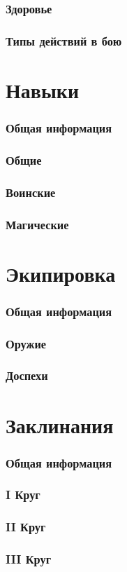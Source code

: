 \documentclass[10pt,twoside,twocolumn,openany]{book}
\begin{document}
\section{Здоровье}
\lipsum[1]
\section{Типы действий в бою}
\lipsum[1]

\part{Навыки}
\section{Общая информация}
\lipsum[1]
\section{Общие}
\lipsum[1]
\section{Воинские}
\lipsum[1]
\section{Магические}
\lipsum[1]

\part{Экипировка}
\section{Общая информация}
\lipsum[1]
\section{Оружие}
\lipsum[1]
\section{Доспехи}
\lipsum[1]

\part{Заклинания}
\section{Общая информация}
\lipsum[1]
\section{\textrm{I} Круг}
\lipsum[1]
\section{\textrm{II} Круг}
\lipsum[1]
\section{\textrm{III} Круг}
\lipsum[1]
\end{document}
